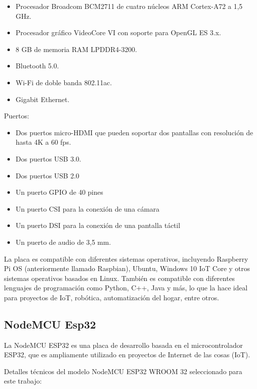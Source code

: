 \begin{itemize}
\item Procesador Broadcom BCM2711 de cuatro núcleos ARM Cortex-A72 a 1,5 GHz.
\item Procesador gráfico VideoCore VI con soporte para OpenGL ES 3.x. 
\item 8 GB de memoria RAM LPDDR4-3200.
\item Bluetooth 5.0.
\item Wi-Fi de doble banda 802.11ac.
\item Gigabit Ethernet.
\end{itemize}

Puertos:
\begin{itemize}
\item Dos puertos micro-HDMI que pueden soportar dos pantallas con resolución de hasta 4K a 60 fps.
\item Dos puertos USB 3.0.
\item Dos puertos USB 2.0
\item Un puerto GPIO de 40 pines
\item Un puerto CSI para la conexión de una cámara
\item Un puerto DSI para la conexión de una pantalla táctil
\item Un puerto de audio de 3,5 mm.
\end{itemize}

La placa es compatible con diferentes sistemas operativos, incluyendo Raspberry Pi OS (anteriormente llamado Raspbian), Ubuntu, Windows 10 IoT Core y otros sistemas operativos basados en Linux. También es compatible con diferentes lenguajes de programación como Python, C++, Java y más, lo que la hace ideal para proyectos de IoT, robótica, automatización del hogar, entre otros.

\subsection{NodeMCU Esp32}
\label{subsec:esp32}

La NodeMCU ESP32 \cite{ESP32-DOC} es una placa de desarrollo basada en el microcontrolador ESP32, que es ampliamente utilizado en proyectos de Internet de las cosas (IoT). 

Detalles técnicos del modelo NodeMCU ESP32 WROOM 32 seleccionado para este trabajo:

